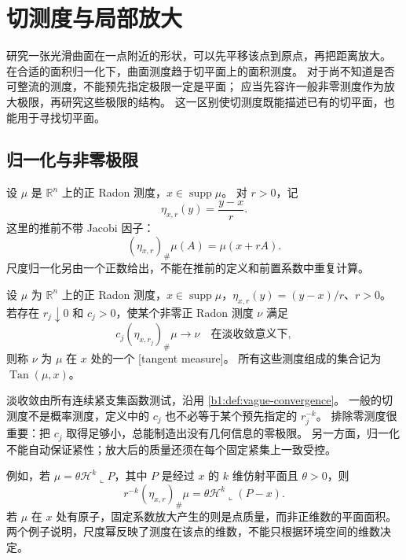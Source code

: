 \section{切测度与局部放大}
\label{b1:sec:D101}

研究一张光滑曲面在一点附近的形状，可以先平移该点到原点，再把距离放大。
在合适的面积归一化下，曲面测度趋于切平面上的面积测度。
对于尚不知道是否可整流的测度，不能预先指定极限一定是平面；
应当先容许一般非零测度作为放大极限，再研究这些极限的结构。
这一区别使切测度既能描述已有的切平面，也能用于寻找切平面。

\subsection{归一化与非零极限}
\label{b1:subsec:D10101}

设 \(\mu\) 是 \(\mathbb R^n\) 上的正 Radon 测度，\(x\in\operatorname{supp}\mu\)。
对 \(r>0\)，记
\[
 \eta_{x,r}(y)=\frac{y-x}{r}.
\]
这里的推前不带 Jacobi 因子：
\[
 (\eta_{x,r})_\#\mu(A)=\mu(x+rA).
\]
尺度归一化另由一个正数给出，不能在推前的定义和前置系数中重复计算。

\begin{definition}\label{b1:def:app-d-tangent-measure}
设 \(\mu\) 为 \(\mathbb R^n\) 上的正 Radon 测度，\(x\in\operatorname{supp}\mu\)，\(\eta_{x,r}(y)=(y-x)/r\)、\(r>0\)。若存在 \(r_j\downarrow0\) 和 \(c_j>0\)，使某个非零正 Radon 测度 \(\nu\) 满足
\[
 c_j(\eta_{x,r_j})_\#\mu\longrightarrow\nu
 \quad\text{在淡收敛意义下},
\]
则称 \(\nu\) 为 \(\mu\) 在 \(x\) 处的一个%
[tangent measure]。
所有这些测度组成的集合记为 \(\operatorname{Tan}(\mu,x)\)。
\end{definition}

淡收敛由所有连续紧支集函数测试，沿用%
\cref{b1:def:vague-convergence}。
一般的切测度不是概率测度，定义中的 \(c_j\) 也不必等于某个预先指定的 \(r_j^{-k}\)。
排除零测度很重要：把 \(c_j\) 取得足够小，总能制造出没有几何信息的零极限。
另一方面，归一化不能自动保证紧性；放大后的质量还须在每个固定紧集上一致受控。

\ProseParagraphBreak

例如，若 \(\mu=\theta\mathcal H^k\llcorner P\)，其中 \(P\) 是经过 \(x\) 的 \(k\) 维仿射平面且 \(\theta>0\)，则
\[
 r^{-k}(\eta_{x,r})_\#\mu
   =\theta\mathcal H^k\llcorner(P-x).
\]
若 \(\mu\) 在 \(x\) 处有原子，固定系数放大产生的则是点质量，而非正维数的平面面积。
两个例子说明，尺度幂反映了测度在该点的维数，不能只根据环境空间的维数决定。

